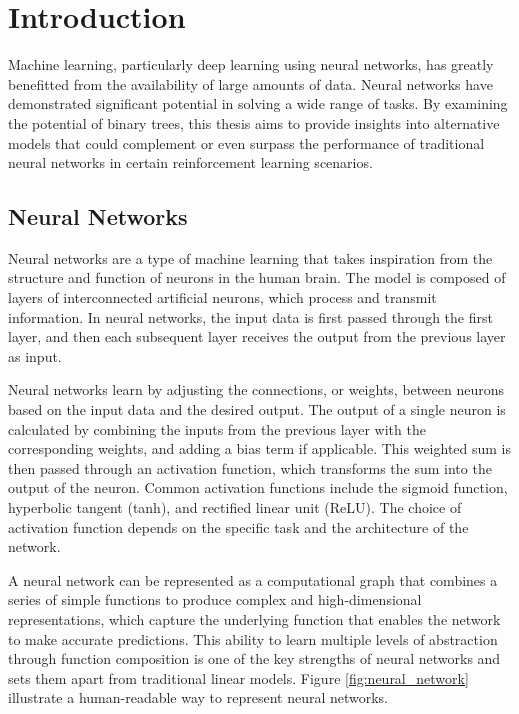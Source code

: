 
\chapter{Introduction}
\label{ch:introduction}
Machine learning, particularly deep learning using neural networks, has greatly benefitted from the availability of large amounts of data. Neural networks have demonstrated significant potential in solving a wide range of tasks. By examining the potential of binary trees, this thesis aims to provide insights into alternative models that could complement or even surpass the performance of traditional neural networks in certain reinforcement learning scenarios.

\section{Neural Networks}

Neural networks are a type of machine learning that takes inspiration from the structure and function of neurons in the human brain. The model is composed of layers of interconnected artificial neurons, which process and transmit information. In neural networks, the input data is first passed through the first layer, and then each subsequent layer receives the output from the previous layer as input.

Neural networks learn by adjusting the connections, or weights, between neurons based on the input data and the desired output. The output of a single neuron is calculated by combining the inputs from the previous layer with the corresponding weights, and adding a bias term if applicable. This weighted sum is then passed through an activation function, which transforms the sum into the output of the neuron. Common activation functions include the sigmoid function, hyperbolic tangent (tanh), and rectified linear unit (ReLU). The choice of activation function depends on the specific task and the architecture of the network.

A neural network can be represented as a computational graph that combines a series of simple functions to produce complex and high-dimensional representations, which capture the underlying function that enables the network to make accurate predictions. This ability to learn multiple levels of abstraction through function composition is one of the key strengths of neural networks and sets them apart from traditional linear models. Figure \ref{fig:neural_network} illustrate a human-readable way to represent neural networks.

